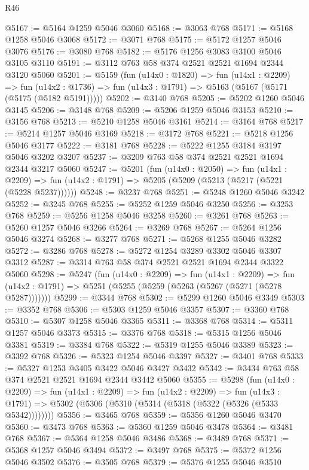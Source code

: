 \begin{lexlean}{R46}
\begin{coremodule}
@5167 := @5164 @1259 @5046 @3060
@5168 := @3063 @768
@5171 := @5168 @1258 @5046 @3068
@5172 := @3071 @768
@5175 := @5172 @1257 @5046 @3076
@5176 := @3080 @768
@5182 := @5176 @1256 @3083 @3100 @5046 @3105 @3110
@5191 := @3112 @763 @58 @374 @2521 @2521 @1694 @2344 @3120 @5060
@5201 := @5159
    (fun (u14x0 : @1820) =>
    fun (u14x1 : @2209) =>
    fun (u14x2 : @1736) => fun (u14x3 : @1791) => @5163 (@5167 (@5171 (@5175 (@5182 @5191)))))
@5202 := @3140 @768
@5205 := @5202 @1260 @5046 @3145
@5206 := @3148 @768
@5209 := @5206 @1259 @5046 @3153
@5210 := @3156 @768
@5213 := @5210 @1258 @5046 @3161
@5214 := @3164 @768
@5217 := @5214 @1257 @5046 @3169
@5218 := @3172 @768
@5221 := @5218 @1256 @5046 @3177
@5222 := @3181 @768
@5228 := @5222 @1255 @3184 @3197 @5046 @3202 @3207
@5237 := @3209 @763 @58 @374 @2521 @2521 @1694 @2344 @3217 @5060
@5247 := @5201
    (fun (u14x0 : @2050) =>
    fun (u14x1 : @2209) =>
    fun (u14x2 : @1791) => @5205 (@5209 (@5213 (@5217 (@5221 (@5228 @5237))))))
@5248 := @3237 @768
@5251 := @5248 @1260 @5046 @3242
@5252 := @3245 @768
@5255 := @5252 @1259 @5046 @3250
@5256 := @3253 @768
@5259 := @5256 @1258 @5046 @3258
@5260 := @3261 @768
@5263 := @5260 @1257 @5046 @3266
@5264 := @3269 @768
@5267 := @5264 @1256 @5046 @3274
@5268 := @3277 @768
@5271 := @5268 @1255 @5046 @3282
@5272 := @3286 @768
@5278 := @5272 @1254 @3289 @3302 @5046 @3307 @3312
@5287 := @3314 @763 @58 @374 @2521 @2521 @1694 @2344 @3322 @5060
@5298 := @5247
    (fun (u14x0 : @2209) =>
    fun (u14x1 : @2209) =>
    fun (u14x2 : @1791) => @5251 (@5255 (@5259 (@5263 (@5267 (@5271 (@5278 @5287)))))))
@5299 := @3344 @768
@5302 := @5299 @1260 @5046 @3349
@5303 := @3352 @768
@5306 := @5303 @1259 @5046 @3357
@5307 := @3360 @768
@5310 := @5307 @1258 @5046 @3365
@5311 := @3368 @768
@5314 := @5311 @1257 @5046 @3373
@5315 := @3376 @768
@5318 := @5315 @1256 @5046 @3381
@5319 := @3384 @768
@5322 := @5319 @1255 @5046 @3389
@5323 := @3392 @768
@5326 := @5323 @1254 @5046 @3397
@5327 := @3401 @768
@5333 := @5327 @1253 @3405 @3422 @5046 @3427 @3432
@5342 := @3434 @763 @58 @374 @2521 @2521 @1694 @2344 @3442 @5060
@5355 := @5298
    (fun (u14x0 : @2209) =>
    fun (u14x1 : @2209) =>
    fun (u14x2 : @2209) =>
    fun (u14x3 : @1791) => @5302 (@5306 (@5310 (@5314 (@5318 (@5322 (@5326 (@5333 @5342))))))))
@5356 := @3465 @768
@5359 := @5356 @1260 @5046 @3470
@5360 := @3473 @768
@5363 := @5360 @1259 @5046 @3478
@5364 := @3481 @768
@5367 := @5364 @1258 @5046 @3486
@5368 := @3489 @768
@5371 := @5368 @1257 @5046 @3494
@5372 := @3497 @768
@5375 := @5372 @1256 @5046 @3502
@5376 := @3505 @768
@5379 := @5376 @1255 @5046 @3510

\end{coremodule}
\end{lexlean}

